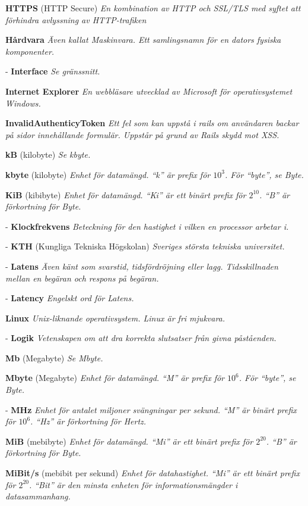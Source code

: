 \documentclass[a4paper, twoside, 11pt, titlepage]{article}
\begin{document}
	\textbf{HTTPS} (HTTP Secure) \emph{En kombination av HTTP och SSL/TLS med syftet att förhindra avlyssning av HTTP-trafiken}

	\textbf{Hårdvara} \emph{Även kallat Maskinvara. Ett samlingsnamn för en dators fysiska komponenter.}

	- \textbf{Interface} \emph{Se gränssnitt.}

	\textbf{Internet Explorer} \emph{En webbläsare utvecklad av Microsoft för operativsystemet Windows.}

	\textbf{InvalidAuthenticyToken} \emph{Ett fel som kan uppstå i rails om användaren backar på sidor innehållande formulär. Uppstår på grund av Rails skydd mot XSS.}

	\textbf{kB} (kilobyte) \emph{Se kbyte.}

	\textbf{kbyte} (kilobyte) \emph{Enhet för datamängd. ``k'' är prefix för $10^{3}$. För ``byte'', se Byte.}

	\textbf{KiB} (kibibyte) \emph{Enhet för datamängd. ``Ki'' är ett binärt prefix för $2^{10}$. ``B'' är förkortning för Byte.}

	- \textbf{Klockfrekvens} \emph{Beteckning för den hastighet i vilken en processor arbetar i.}

	- \textbf{KTH} (Kungliga Tekniska Högskolan) \emph{Sveriges största tekniska universitet.}

	- \textbf{Latens} \emph{Även känt som svarstid, tidsfördröjning eller lagg. Tidsskillnaden mellan en begäran och respons på begäran.}

	- \textbf{Latency} \emph{Engelskt ord för Latens.}

	\textbf{Linux} \emph{Unix-liknande operativsystem. Linux är fri mjukvara.}

	- \textbf{Logik} \emph{Vetenskapen om att dra korrekta slutsatser från givna påståenden.}

	\textbf{Mb} (Megabyte) \emph{Se Mbyte.}

	\textbf{Mbyte} (Megabyte) \emph{Enhet för datamängd. ``M'' är prefix för $10^{6}$. För ``byte'', se Byte.}

	- \textbf{MHz} \emph{Enhet för antalet miljoner svängningar per sekund. ``M'' är binärt prefix för $10^{6}$. ``Hz'' är förkortning för Hertz.}

	\textbf{MiB} (mebibyte) \emph{Enhet för datamängd. ``Mi'' är ett binärt prefix för $2^{20}$. ``B'' är förkortning för Byte.}

	\textbf{MiBit/s} (mebibit per sekund) \emph{Enhet för datahastighet. ``Mi'' är ett binärt prefix för $2^{20}$. ``Bit'' är den minsta enheten för informationsmängder i datasammanhang.}
\end{document}
